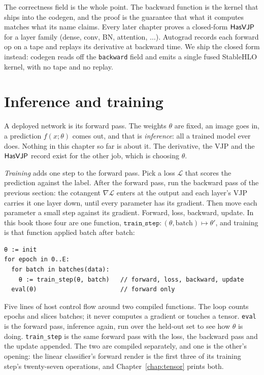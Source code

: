 The correctness field is the whole point. The backward function is the
kernel that ships into the codegen, and the proof is the guarantee that
what it computes matches what its name claims. Every later chapter proves
a closed-form \(\mathsf{HasVJP}\) for a layer family (dense, conv, BN, attention,
$\ldots$). Autograd records each forward op on a tape and replays its
derivative at backward time. We ship the closed form instead: codegen
reads off the \texttt{backward} field and emits a single fused StableHLO
kernel, with no tape and no replay.

\section*{Inference and training}

A deployed network is its forward pass. The weights \(\theta\) are
fixed, an image goes in, a prediction \(f(x;\theta)\) comes out, and
that is \emph{inference}: all a trained model ever does. Nothing in this
chapter so far is about it. The derivative, the VJP and the
\(\mathsf{HasVJP}\) record exist for the other job, which is choosing
\(\theta\).

\emph{Training} adds one step to the forward pass. Pick a loss
\(\mathcal{L}\) that scores the prediction against the label. After the
forward pass, run the backward pass of the previous section: the
cotangent \(\nabla\mathcal{L}\) enters at the output and each layer's
VJP carries it one layer down, until every parameter has its gradient.
Then move each parameter a small step against its gradient. Forward,
loss, backward, update. In this book those four are one function,
\(\texttt{train\_step} : (\theta, \text{batch}) \mapsto \theta'\), and
training is that function applied batch after batch:

\begin{verbatim}
θ := init
for epoch in 0..E:
  for batch in batches(data):
    θ := train_step(θ, batch)   // forward, loss, backward, update
  eval(θ)                       // forward only
\end{verbatim}

\noindent Five lines of host control flow around two compiled functions.
The loop counts epochs and slices batches; it never computes a gradient
or touches a tensor. \texttt{eval} is the forward pass, inference again,
run over the held-out set to see how \(\theta\) is doing.
\texttt{train\_step} is the same forward pass with the loss, the
backward pass and the update appended. The two are compiled separately,
and one is the other's opening: the linear classifier's
forward render is the first three of its training step's twenty-seven
operations, and Chapter~\ref{chap:tensor} prints both.


